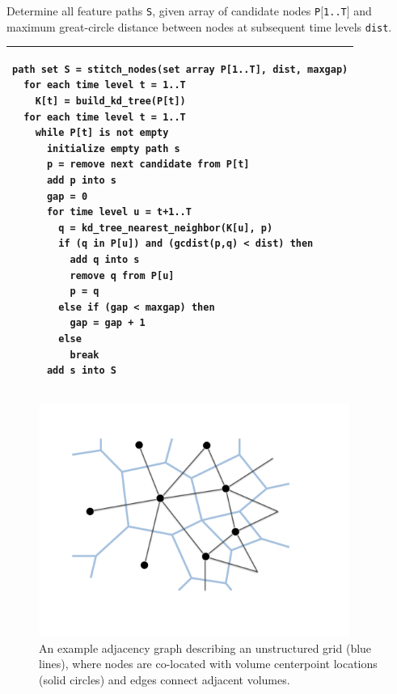 \documentclass[gmdd, hvmath, online]{copernicus_discussions}
\begin{document}
\begin{algorithm}
\caption{Determine all feature paths \texttt{S}, given array of candidate nodes \texttt{P$[$1..T$]$} and maximum great-circle distance between nodes at subsequent time levels \texttt{dist}.\ \\} \label{alg:stitch_nodes}
\noindent \begin{tabular}{p{5in}}
\hline \small \begin{verbatim}
path set S = stitch_nodes(set array P[1..T], dist, maxgap)
  for each time level t = 1..T
    K[t] = build_kd_tree(P[t])
  for each time level t = 1..T
    while P[t] is not empty
      initialize empty path s
      p = remove next candidate from P[t]
      add p into s
      gap = 0
      for time level u = t+1..T
        q = kd_tree_nearest_neighbor(K[u], p)
        if (q in P[u]) and (gcdist(p,q) < dist) then
          add q into s
          remove q from P[u]
          p = q
        else if (gap < maxgap) then
          gap = gap + 1
        else
          break
      add s into S
\end{verbatim} \\
\hline
\end{tabular}
\end{algorithm}


\begin{figure}[H]
\begin{center}
\includegraphics[width=4in]{UnstructuredGrid.pdf}
\end{center}
\caption{An example adjacency graph describing an unstructured grid (blue lines), where nodes are co-located with volume centerpoint locations (solid circles) and edges connect adjacent volumes.} \label{fig:unstructured_grid}
\end{figure}
\end{document}
